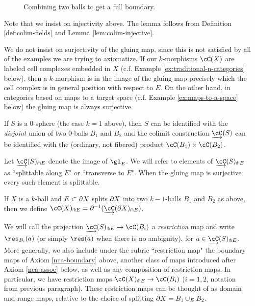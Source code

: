 \begin{figure}[t] \centering
{}
\caption{Combining two balls to get a full boundary.}\label{blah3}\end{figure}

Note that we insist on injectivity above. 
The lemma follows from Definition \ref{def:colim-fields} and Lemma \ref{lem:colim-injective}.

We do not insist on surjectivity of the gluing map, since this is not satisfied by all of the examples
we are trying to axiomatize.
If our $k$-morphisms $\cC(X)$ are labeled cell complexes embedded in $X$ (c.f. Example \ref{ex:traditional-n-categories} below), then a $k$-morphism is
in the image of the gluing map precisely which the cell complex is in general position
with respect to $E$. On the other hand, in categories based on maps to a target space (c.f. Example \ref{ex:maps-to-a-space} below) the gluing map is always surjective

If $S$ is a 0-sphere (the case $k=1$ above), then $S$ can be identified with the {\it disjoint} union
of two 0-balls $B_1$ and $B_2$ and the colimit construction $\cl{\cC}(S)$ can be identified
with the (ordinary, not fibered) product $\cC(B_1) \times \cC(B_2)$.

Let $\cl{\cC}(S)\trans E$ denote the image of $\gl_E$.
We will refer to elements of $\cl{\cC}(S)\trans E$ as ``splittable along $E$" or ``transverse to $E$".  When the gluing map is surjective every such element is splittable.

If $X$ is a $k$-ball and $E \subset \partial X$ splits $\partial X$ into two $k{-}1$-balls $B_1$ and $B_2$
as above, then we define $\cC(X)\trans E = \bd^{-1}(\cl{\cC}(\bd X)\trans E)$.

We will call the projection $\cl{\cC}(S)\trans E \to \cC(B_i)$
a {\it restriction} map and write $\res_{B_i}(a)$
(or simply $\res(a)$ when there is no ambiguity), for $a\in \cl{\cC}(S)\trans E$.
More generally, we also include under the rubric ``restriction map"
the boundary maps of Axiom \ref{nca-boundary} above,
another class of maps introduced after Axiom \ref{nca-assoc} below, as well as any composition
of restriction maps.
In particular, we have restriction maps $\cC(X)\trans E \to \cC(B_i)$
($i = 1, 2$, notation from previous paragraph).
These restriction maps can be thought of as 
domain and range maps, relative to the choice of splitting $\partial X = B_1 \cup_E B_2$.


